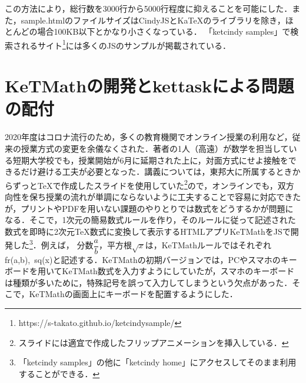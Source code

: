 \documentclass[a4j,12pt]{ujarticle}
\begin{document}
この方法により，総行数を3000行から5000行程度に抑えることを可能にした．また，sample.htmlのファイルサイズはCindyJSとKaTeXのライブラリを除き，ほとんどの場合100KB以下とかなり小さくなっている．
「ketcindy samples」で検索されるサイト\footnote{https://s-takato.github.io/ketcindysample/}には多くの\ketcindy JSのサンプルが掲載されている．

\section{KeTMathの開発とkettaskによる問題の配付}

2020年度はコロナ流行のため，多くの教育機関でオンライン授業の利用など，従来の授業方式の変更を余儀なくされた．著者の1人（高遠）が数学を担当している短期大学校でも，授業開始が6月に延期された上に，対面方式にせよ接触をできるだけ避ける工夫が必要となった．講義については，東邦大に所属するときからずっと\TeX で作成したスライドを使用していた\footnote{スライドには適宜\ketcindy で作成したフリップアニメーションを挿入している．}ので，オンラインでも，双方向性を保ち授業の流れが単調にならないように工夫することで容易に対応できたが，プリントやPDFを用いない課題のやりとりでは数式をどうするかが問題になる．そこで，1次元の簡易数式ルールを作り，そのルールに従って記述された数式を即時に2次元\TeX 数式に変換して表示するHTMLアプリKeTMathを\ketcindy JSで開発した\footnote{「ketcindy samples」の他に「ketcindy home」にアクセスしてそのまま利用することができる．}．例えば，
分数$\dfrac{a}{b}$，平方根$\sqrt{x}$は，KeTMathルールではそれぞれfr(a,b),\ sq(x)と記述する．KeTMathの初期バージョンでは，PCやスマホのキーボードを用いてKeTMath数式を入力すようにしていたが，スマホのキーボードは種類が多いために，特殊記号を誤って入力してしまうという欠点があった．そこで，KeTMathの画面上にキーボードを配置するようにした．
\end{document}
